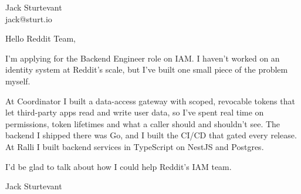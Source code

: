 \documentclass[11pt]{article}
\begin{document}
\raggedright

{\namefont\fontsize{20pt}{24pt}\selectfont Jack Sturtevant}\\[-0.3em]
jack@sturt.io

\vspace{1.2em}

Hello Reddit Team,

I'm applying for the Backend Engineer role on IAM. I haven't worked on an identity system at Reddit's scale, but I've built one small piece of the problem myself.

At Coordinator I built a data-access gateway with scoped, revocable tokens that let third-party apps read and write user data, so I've spent real time on permissions, token lifetimes and what a caller should and shouldn't see. The backend I shipped there was Go, and I built the CI/CD that gated every release. At Ralli I built backend services in TypeScript on NestJS and Postgres.

I'd be glad to talk about how I could help Reddit's IAM team.

\vspace{0.6em}
Jack Sturtevant
\end{document}
